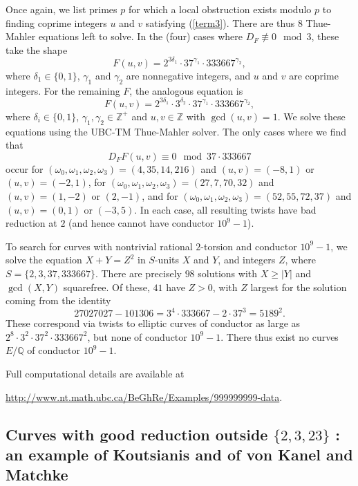 Once again, we list primes $p$ for which a local obstruction exists modulo $p$ to finding coprime integers  $u$ and $v$ satisfying (\ref{term3}). There are thus $8$ Thue-Mahler equations left to solve.
In the (four) cases where  $D_F \not\equiv 0 \mod{3}$, these take the shape
$$
F(u,v) = 2^{3 \delta_1} \cdot 37^{\gamma_1} \cdot 333667^{\gamma_2},
$$
where $\delta_1 \in \{ 0, 1 \}$, $\gamma_1$ and $\gamma_2$ are nonnegative integers, and $u$ and $v$ are coprime integers. For the remaining $F$, the analogous equation is
$$
F(u,v) = 2^{3 \delta_1} \cdot 3^{\delta_2} \cdot 37^{\gamma_1} \cdot 333667^{\gamma_2},
$$
where $\delta_i \in \{ 0, 1 \}$, $\gamma_1, \gamma_2 \in \mathbb{Z}^+$ and $u, v \in \mathbb{Z}$ with $\gcd(u,v)=1$. We solve these equations using the UBC-TM Thue-Mahler solver. The only cases where we find  that
$$
D_F F(u,v) \equiv 0 \mod{37 \cdot 333667}
$$
occur for $(\omega_0,\omega_1,\omega_2,\omega_3)=(4,35,14,216)$ and $(u,v)=(-8,1)$ or $(u,v)=(-2,1)$, for
 $(\omega_0,\omega_1,\omega_2,\omega_3)=(27,7,70,32)$ and $(u,v)=(1,-2)$ or $(2,-1)$, and for $(\omega_0,\omega_1,\omega_2,\omega_3)=(52,55,72,37)$ and 
 $(u,v)=(0,1)$ or $(-3,5)$. In each case, all resulting  twists have bad reduction at $2$ (and hence cannot have conductor $10^9-1$).
 
 To search for curves with nontrivial rational $2$-torsion and conductor $10^9-1$, we solve the equation $X+Y=Z^2$ in $S$-units $X$ and $Y$, and integers $Z$, where 
 $S=\{2,3, 37, 333667 \}$. There are precisely $98$ solutions with $X \geq |Y|$ and  $\gcd (X,Y)$ squarefree. Of these, $41$ have $Z > 0$, with $Z$ largest for the solution coming from  the identity
$$
27027027 -101306 = 3^4 \cdot 333667 -  2 \cdot 37^3 =  5189^2.
$$
These correspond via twists to elliptic curves of conductor as large as $2^8 \cdot 3^2 \cdot 37^2 \cdot 333667^2$, but none of conductor $10^9-1$. There thus exist no curves $E/\mathbb{Q}$  of conductor $10^9-1$.

Full computational details are available at
\begin{center}
\url{http://www.nt.math.ubc.ca/BeGhRe/Examples/999999999-data}.
\end{center}



\subsection{Curves with good reduction outside $\{ 2, 3, 23 \}$ : an example of Koutsianis and of von Kanel and Matchke}

